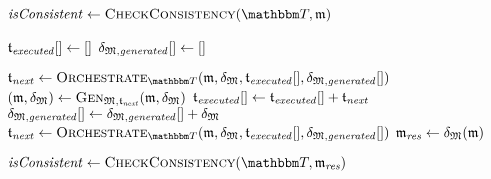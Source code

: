 \begin{algorithmic}[1]
        \algindentskip
        \State $\mathvariable{isConsistent} \gets \function{CheckConsistency}(\transformationset{T}, \modeltuple{m})$
            \State \Return{$\bot$}
        \EndIf
        \algblockskip

        \State $\mathfrak{t}_{\mathit{executed}}[] \gets []$
        \State $\mathfrak{\delta}_{\mathfrak{M}, \mathit{generated}}[] \gets []$
        \algblockskip

        \State $\transformation{t}_\mathvariable{next} \gets \function{Orchestrate}_{\transformationset{T}}(\modeltuple{m}, \changetuple{\metamodeltuple{M}}, \applyalgexecuted, \applyalggenerated)$ \label{algo:orchestration:application:line:startorchestrate}
            \State $(\mathfrak{m}, \mathfrak{\delta}_{\mathfrak{M}}) \gets \textsc{Gen}_{\mathfrak{M}, \mathfrak{t}_{\mathit{next}}}(\mathfrak{m}, \mathfrak{\delta}_{\mathfrak{M}})$ \label{algo:orchestration:application:line:stepcalculation}
            \State $\mathfrak{t}_{\mathit{executed}}[] \gets \mathfrak{t}_{\mathit{executed}}[] + \mathfrak{t}_{\mathit{next}}$
            \State $\mathfrak{\delta}_{\mathfrak{M}, \mathit{generated}}[] \gets \mathfrak{\delta}_{\mathfrak{M}, \mathit{generated}}[] + \mathfrak{\delta}_{\mathfrak{M}}$
            \State $\transformation{t}_\mathvariable{next} \gets \function{Orchestrate}_{\transformationset{T}}(\modeltuple{m}, \changetuple{\metamodeltuple{M}}, \applyalgexecuted, \applyalggenerated)$
        \EndWhile \label{algo:orchestration:application:line:endorchestrate}
        \State $\mathfrak{m}_{\mathit{res}} \gets \mathfrak{\delta}_{\mathfrak{M}}(\mathfrak{m})$
        \algblockskip
        
        \State $\mathvariable{isConsistent} \gets \function{CheckConsistency}(\transformationset{T}, \modeltuple{m}_\mathvariable{res})$ \label{algo:orchestration:application:line:startconsistencycheck}
            \State \Return{$\bot$}
        \EndIf \label{algo:orchestration:application:line:endconsistencycheck}
        \algblockskip

        \State {} \label{algo:orchestration:application:line:returnresult}
        \algindentskip
    \EndProcedure
\end{algorithmic}